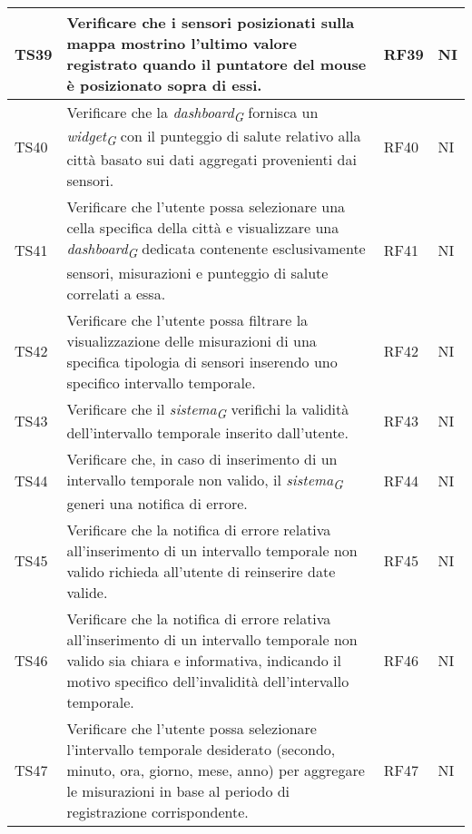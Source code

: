\begin{longtable}{|C{1.9cm}|L{5cm}|C{2cm}|C{2cm}|}
    TS39 & Verificare che i sensori posizionati sulla mappa mostrino l'ultimo valore registrato quando il puntatore del mouse è posizionato sopra di essi. & RF39 & NI \\
    \hline

    TS40 & Verificare che la \textit{dashboard}\textsubscript{\textit{G}} fornisca un \textit{widget}\textsubscript{\textit{G}} con il punteggio di salute relativo alla città basato sui dati aggregati provenienti dai sensori. & RF40 & NI \\
    \hline

    TS41 & Verificare che l'utente possa selezionare una cella specifica della città e visualizzare una \textit{dashboard}\textsubscript{\textit{G}} dedicata contenente esclusivamente sensori, misurazioni e punteggio di salute correlati a essa. & RF41 & NI \\
    \hline

    TS42 & Verificare che l'utente possa filtrare la visualizzazione delle misurazioni di una specifica tipologia di sensori inserendo uno specifico intervallo temporale. & RF42 & NI \\
    \hline

    TS43 & Verificare che il \textit{sistema}\textsubscript{\textit{G}} verifichi la validità dell'intervallo temporale inserito dall'utente. & RF43 & NI \\
    \hline

    TS44 & Verificare che, in caso di inserimento di un intervallo temporale non valido, il \textit{sistema}\textsubscript{\textit{G}} generi una notifica di errore. & RF44 & NI \\
    \hline

    TS45 & Verificare che la notifica di errore relativa all'inserimento di un intervallo temporale non valido richieda all'utente di reinserire date valide. & RF45 & NI \\
    \hline

    TS46 & Verificare che la notifica di errore relativa all'inserimento di un intervallo temporale non valido sia chiara e informativa, indicando il motivo specifico dell'invalidità dell'intervallo temporale. & RF46 & NI \\
    \hline

    TS47 & Verificare che l'utente possa selezionare l'intervallo temporale desiderato (secondo, minuto, ora, giorno, mese, anno) per aggregare le misurazioni in base al periodo di registrazione corrispondente. & RF47 & NI \\
    \hline


\end{longtable}
